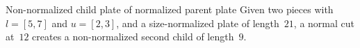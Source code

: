 \documentclass[ppgc,prop-tese,english,formais,babel]{iiufrgs}
\begin{document}






\begin{example}{Non-normalized child plate of normalized parent plate}
Given two pieces with \(l = [5, 7]\) and \(u = [2, 3]\), and a size-normalized plate of length~\(21\), a normal cut at~\(12\) creates a non-normalized second child of length~\(9\). %
\end{example}
\end{document}
